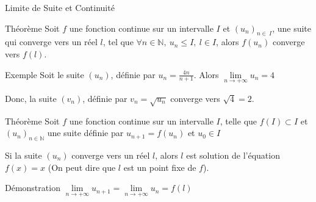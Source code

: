 \documentclass{cours}
\begin{document}
    \begin{Gpartie}{Limite de Suite et Continuité} 
        \begin{Spartie}{Théorème} 
            Soit $f$ une fonction continue sur un intervalle $I$ et $(u_n)_{n\in\ I}$, une suite qui converge vers un réel $l$, tel que $\forall n\in\mathbb{N},\ u_n\leq I,\ l\in I$, alors $f(u_n)$ converge vers $f(l)$.
            \begin{SSpartie}{Exemple} 
                Soit le suite $(u_n)$, définie par $u_n=\frac{4n}{n+1}$. Alors $\lim\limits_{n\to +\infty}u_n=4$
                
                Donc, la suite $(v_n)$, définie par $v_n=\sqrt{u_n}$ converge vers $\sqrt{4}=2$.
            \end{SSpartie}
        \end{Spartie}
        \begin{Spartie}{Théorème}
            Soit $f$ une fonction continue sur un intervalle $I$, telle que $f(I)\subset I$ et $(u_n)_{n\in\mathbb{N}}$ une suite définie par $u_{n+1}=f(u_n)$ et $u_0\in I$
            
            Si la suite $(u_n)$ converge vers un réel $l$, alors $l$ est solution de l'équation $f(x)=x$ (On peut dire que $l$ est un point fixe de $f$).
            \begin{SSpartie}{Démonstration} 
                $\lim\limits_{n\to +\infty}u_{n+1}=\lim\limits_{n\to +\infty}u_n=f(l)$
            \end{SSpartie}
        \end{Spartie}
    \end{Gpartie}
\end{document}
